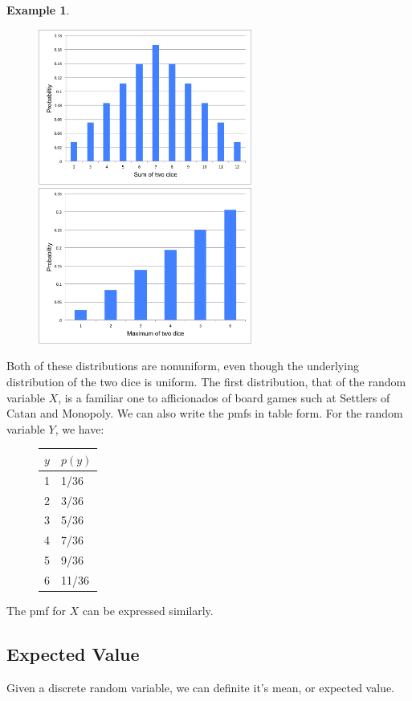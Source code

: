 \documentclass[12pt]{article}
\theoremstyle{definition}
\newtheorem*{example}{Example}
\theoremstyle{remark}
\begin{document}
\begin{example}
\begin{figure}[H]
\centering
\includegraphics[width=7cm]{sumoftwodice.pdf}
\includegraphics[width=7cm]{maxoftwodice.pdf}
\end{figure}
Both of these distributions are nonuniform, even though the underlying distribution of the two dice is uniform. The first distribution, that of the random variable $X$, is a familiar one to afficionados of board games such at Settlers of Catan and Monopoly. We can also write the pmfs in table form. For the random variable $Y$, we have:
\begin{figure}[H]
\centering
\begin{tabular}{l@{\hskip 2cm}l}
\toprule
$y$ & $p(y)$\\
\midrule
1 & 1/36\\
2 & 3/36\\
3 & 5/36\\
4 & 7/36\\
5 & 9/36\\
6 & 11/36\\
\bottomrule
\end{tabular}
\end{figure}
The pmf for $X$ can be expressed similarly.
\end{example}

\subsection{Expected Value}
Given a discrete random variable, we can definite it's mean, or expected value. 
\end{document}
